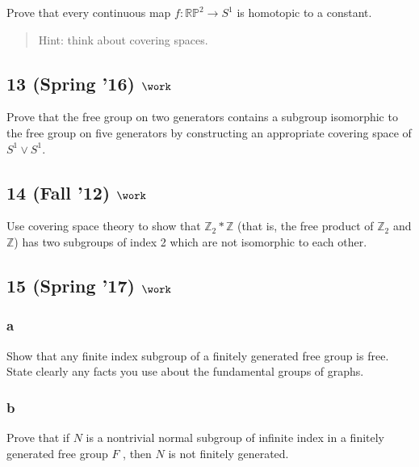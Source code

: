 Prove that every continuous map \(f : {\mathbb{RP}}^2 \to S^1\) is
homotopic to a constant.

\begin{quote}
Hint: think about covering spaces.
\end{quote}

\hypertarget{spring-16-work-1}{%
\subsection{\texorpdfstring{13 (Spring '16)
\(\work\)}{13 (Spring '16) \textbackslash work}}\label{spring-16-work-1}}

Prove that the free group on two generators contains a subgroup
isomorphic to the free group on five generators by constructing an
appropriate covering space of \(S^1 \lor S^1\).

\hypertarget{fall-12-work-1}{%
\subsection{\texorpdfstring{14 (Fall '12)
\(\work\)}{14 (Fall '12) \textbackslash work}}\label{fall-12-work-1}}

Use covering space theory to show that
\({\mathbb{Z}}_2 \ast {\mathbb{Z}}\) (that is, the free product of
\({\mathbb{Z}}_2\) and \({\mathbb{Z}}\)) has two subgroups of index 2
which are not isomorphic to each other.

\hypertarget{spring-17-work}{%
\subsection{\texorpdfstring{15 (Spring '17)
\(\work\)}{15 (Spring '17) \textbackslash work}}\label{spring-17-work}}

\hypertarget{a-16}{%
\subsubsection{a}\label{a-16}}

Show that any finite index subgroup of a finitely generated free group
is free. State clearly any facts you use about the fundamental groups of
graphs.

\hypertarget{b-16}{%
\subsubsection{b}\label{b-16}}

Prove that if \(N\) is a nontrivial normal subgroup of infinite index in
a finitely generated free group \(F\) , then \(N\) is not finitely
generated.

